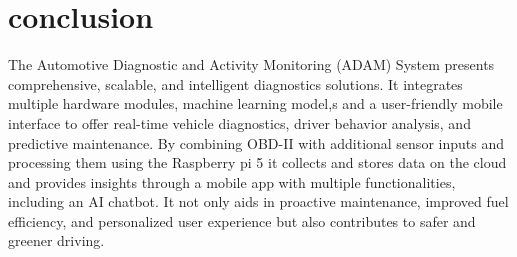 \section{conclusion}
The Automotive Diagnostic and Activity Monitoring (ADAM) System presents comprehensive, scalable, and intelligent diagnostics solutions. It integrates multiple hardware modules, machine learning model,s and a user-friendly mobile interface to offer real-time vehicle diagnostics, driver behavior analysis, and predictive maintenance. By combining OBD-II with additional sensor inputs and processing them using the Raspberry pi 5 it collects and stores data on the cloud and provides insights through a mobile app with multiple functionalities, including an AI chatbot. It not only aids in proactive maintenance, improved fuel efficiency, and personalized user experience but also contributes to safer and greener driving.
